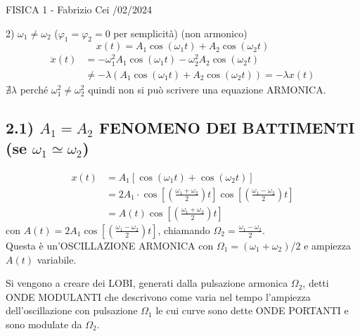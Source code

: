 \documentclass{article}
\begin{document}
\begin{flushright}
FISICA 1 - Fabrizio Cei /02/2024
\end{flushright}

2) $\omega_1 \neq \omega_2$ ($\varphi_1 = \varphi_2 = 0$ per semplicità) (non armonico)
\begin{equation*}
x(t) = A_1 \cos(\omega_1 t) + A_2 \cos(\omega_2 t)
\end{equation*}
\begin{align*}
\ddot{x}(t) &= -\omega_1^2 A_1 \cos(\omega_1 t) - \omega_2^2 A_2 \cos(\omega_2 t) \\
&\neq -\lambda (A_1 \cos(\omega_1 t) + A_2 \cos(\omega_2 t)) = -\lambda x(t)
\end{align*}
$\nexists \lambda$ perché $\omega_1^2 \neq \omega_2^2$ quindi non si può scrivere una equazione ARMONICA.

\subsection*{2.1) $A_1 = A_2$ FENOMENO DEI BATTIMENTI (se $\omega_1 \simeq \omega_2$)}
\begin{align*}
x(t) &= A_1 [\cos(\omega_1 t) + \cos(\omega_2 t)] \\
&= 2A_1 \cdot \cos\left[ \left( \frac{\omega_1 + \omega_2}{2} \right) t \right] \cos\left[ \left( \frac{\omega_1 - \omega_2}{2} \right) t \right] \\
&= A(t) \cos\left[ \left( \frac{\omega_1 + \omega_2}{2} \right) t \right]
\end{align*}
con $A(t) = 2A_1 \cos\left[ \left( \frac{\omega_1 - \omega_2}{2} \right) t \right]$, chiamando $\Omega_2 = \frac{\omega_1 - \omega_2}{2}$.\\
Questa è un'OSCILLAZIONE ARMONICA con $\Omega_1 = (\omega_1 + \omega_2)/2$ e ampiezza $A(t)$ variabile.

\vspace{0.5cm}
\begin{minipage}{0.4\textwidth}
\end{minipage}
\hfill
\begin{minipage}{0.55\textwidth}
Si vengono a creare dei LOBI, generati dalla pulsazione armonica $\Omega_2$, detti ONDE MODULANTI che descrivono come varia nel tempo l'ampiezza dell'oscillazione con pulsazione $\Omega_1$ le cui curve sono dette ONDE PORTANTI e sono modulate da $\Omega_2$.
\end{minipage}
\end{document}
